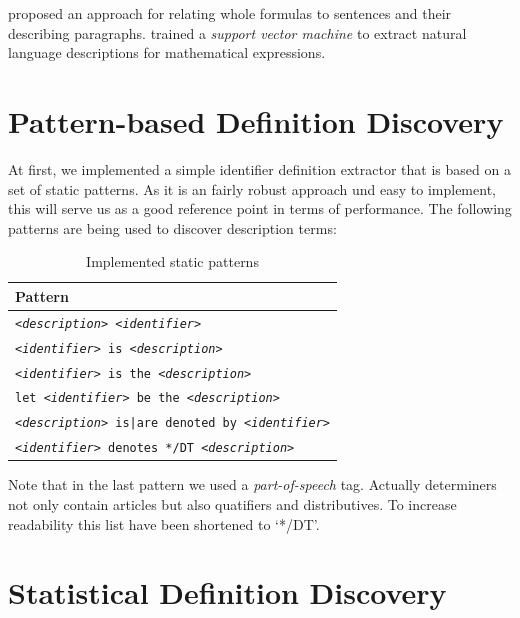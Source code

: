 \documentclass[runningheads]{llncs}
\begin{document}
\citeauthor{Quoc2010} \cite{Quoc2010} proposed an approach for
relating whole formulas to sentences and their describing paragraphs.
\citeauthor{Yokoi} \cite{Yokoi} trained a \emph{support vector machine} to extract
natural language descriptions for mathematical expressions.

\section{Pattern-based Definition Discovery}

At first, we implemented a simple identifier definition extractor that is
based on a set of static patterns. As it is an fairly robust approach und easy
to implement, this will serve us as a good reference point in terms of
performance. The following patterns are being used to discover description
terms:

\begin{table}
\vspace{-5pt}
	\begin{center}
		\begin{tabular}{| p{9.3cm} |}
			\hline
			Pattern \\
			\hline
			\texttt{\emph{<description>} \emph{<identifier>}} \\
			\texttt{\emph{<identifier>} is \emph{<description>}} \\
			\texttt{\emph{<identifier>} is the \emph{<description>}} \\
			\texttt{let \emph{<identifier>} be the \emph{<description>}} \\
			\texttt{\emph{<description>} is|are denoted by \emph{<identifier>}} \\
			\texttt{\emph{<identifier>} denotes */DT \emph{<description>}} \\
			\hline
		\end{tabular}
	\end{center}
\caption{Implemented static patterns}
\vspace{-5pt}
\end{table}

Note that in the last pattern we used a \emph{part-of-speech} tag. Actually
determiners not only contain articles but also quatifiers and distributives.
To increase readability this list have been shortened to `*/DT'.


\section{Statistical Definition Discovery}
\end{document}
